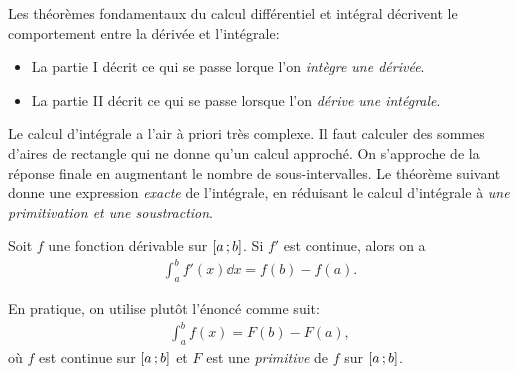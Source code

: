 \documentclass[main.tex]{subfiles}
\begin{document}
Les théorèmes fondamentaux du calcul différentiel et intégral décrivent le comportement entre la dérivée et l'intégrale:

\begin{itemize}
    \item La partie I décrit ce qui se passe lorque l'on \emph{intègre une dérivée}.
    \item La partie II décrit ce qui se passe lorsque l'on \emph{dérive une intégrale}.
\end{itemize}

Le calcul d'intégrale a l'air à priori très complexe.
Il faut calculer des sommes d'aires de rectangle qui ne donne qu'un calcul approché.
On s'approche de la réponse finale en augmentant le nombre de sous-intervalles.
Le théorème suivant donne une expression \emph{exacte} de l'intégrale,
en réduisant le calcul d'intégrale à \emph{une primitivation et une soustraction}.

\begin{theorem}

    Soit $f$ une fonction dérivable sur $\mathopen{[}a\,;b\mathclose{]}$.
    Si $f'$ est continue,
    alors on a
    \begin{align*}
        \int_a^b f'(x) \dd x = f(b) - f(a).
    \end{align*}
\end{theorem}

\begin{remark}

    En pratique,
    on utilise plutôt l'énoncé comme suit:
    \begin{align}
        \int_a^b f(x) = F(b) - F(a),
    \end{align}
    où $f$ est continue sur $\mathopen{[}a\,;b\mathclose{]}$
    et $F$ est une \emph{primitive} de $f$ sur $\mathopen{[}a\,;b\mathclose{]}$.
\end{remark}
\end{document}
